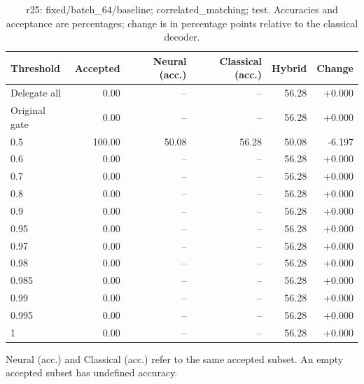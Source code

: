\begin{table}[htbp]
\centering\small
\setlength{\tabcolsep}{3pt}
\caption{r25: fixed/batch\_64/baseline; correlated\_matching; test. Accuracies and acceptance are percentages; change is in percentage points relative to the classical decoder.}
\begin{tabular}{lrrrrr}
\toprule
Threshold & Accepted & Neural (acc.) & Classical (acc.) & Hybrid & Change \\
\midrule
Delegate all & 0.00 & -- & -- & 56.28 & +0.000 \\
Original gate & 0.00 & -- & -- & 56.28 & +0.000 \\
0.5 & 100.00 & 50.08 & 56.28 & 50.08 & -6.197 \\
0.6 & 0.00 & -- & -- & 56.28 & +0.000 \\
0.7 & 0.00 & -- & -- & 56.28 & +0.000 \\
0.8 & 0.00 & -- & -- & 56.28 & +0.000 \\
0.9 & 0.00 & -- & -- & 56.28 & +0.000 \\
0.95 & 0.00 & -- & -- & 56.28 & +0.000 \\
0.97 & 0.00 & -- & -- & 56.28 & +0.000 \\
0.98 & 0.00 & -- & -- & 56.28 & +0.000 \\
0.985 & 0.00 & -- & -- & 56.28 & +0.000 \\
0.99 & 0.00 & -- & -- & 56.28 & +0.000 \\
0.995 & 0.00 & -- & -- & 56.28 & +0.000 \\
1 & 0.00 & -- & -- & 56.28 & +0.000 \\
\bottomrule
\end{tabular}
\par\smallskip\footnotesize Neural (acc.) and Classical (acc.) refer to the same accepted subset. An empty accepted subset has undefined accuracy.
\end{table}

